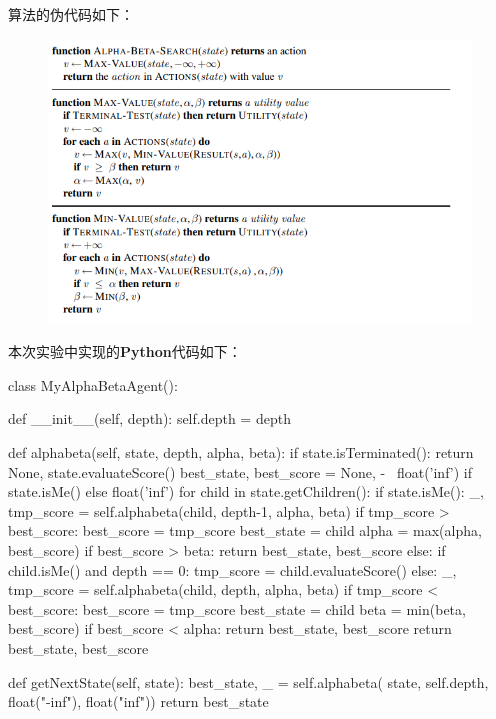 \documentclass{ctexart}
\begin{document}
\par 算法的伪代码如下：
\begin{figure}[H]	
	\centering	
	\includegraphics[scale=0.6]{alphabeta.png}
		
\end{figure}
\par 本次实验中实现的\textbf{Python}代码如下：
\begin{python}
class MyAlphaBetaAgent():

    def __init__(self, depth):
        self.depth = depth

    def alphabeta(self, state, depth, alpha, beta):
        if state.isTerminated():
            return None, state.evaluateScore()
        best_state, best_score = None, - \
            float('inf') if state.isMe() else float('inf')
        for child in state.getChildren():
            if state.isMe():
                _, tmp_score = self.alphabeta(child, depth-1, alpha, beta)
                if tmp_score > best_score:
                    best_score = tmp_score
                    best_state = child
                alpha = max(alpha, best_score)
                if best_score > beta:
                    return best_state, best_score
            else:
                if child.isMe() and depth == 0:
                    tmp_score = child.evaluateScore()
                else:
                    _, tmp_score = self.alphabeta(child, depth, alpha, beta)
                if tmp_score < best_score:
                    best_score = tmp_score
                    best_state = child
                beta = min(beta, best_score)
                if best_score < alpha:
                    return best_state, best_score
        return best_state, best_score

    def getNextState(self, state):
        best_state, _ = self.alphabeta(
            state, self.depth, float("-inf"), float("inf"))
        return best_state
	\end{python}
\end{document}
